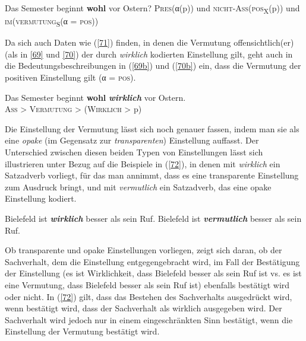 \begin{exe}
	\ex\label{70} 
		\begin{xlist}	
			\ex\label{70a} Das Semester beginnt \textbf{wohl} vor Ostern?
			\ex\label{70b} \textsc{Pres}(α(p)) und \textsc{nicht-Ass}(\textsc{pos}\textsubscript{X}(p)) und \textsc{im}(\textsc{vermutung}\textsubscript{\textrm{S}}(α = \textsc{pos}))
		\end{xlist}
\end{exe}
Da sich auch Daten wie (\ref{71}) finden, in denen die Vermutung offensichtlich(er) (als in \ref{69} und \ref{70}) der durch \textit{wirklich} kodierten Einstellung gilt, geht auch in die Bedeutungsbeschreibungen in (\ref{69b}) und (\ref{70b}) ein, dass die Vermutung der positiven Einstellung gilt (α = \textrm{\textsc{pos}}).

\begin{exe}
	\ex\label{71} 
	Das Semester beginnt \textbf{wohl} \textbf{\textit{wirklich}} vor Ostern.\\
	\textsc{Ass} > \textsc{Vermutung} > (\textsc{Wirklich} > p)	
\end{exe}
Die Einstellung der Vermutung lässt sich noch genauer fassen, indem man sie als eine \textit{opake} (im Gegensatz zur \textit{transparenten})  Einstellung auffasst. Der Unterschied zwischen diesen beiden Typen von Einstellungen lässt sich illustrieren unter Bezug auf die Beispiele in (\ref{72}), in denen mit \textit{wirklich} ein Satzadverb vorliegt, für das man annimmt, dass es eine transparente Einstellung zum Ausdruck bringt, und mit \textit{vermutlich} ein Satzadverb, das eine opake Einstellung kodiert.

\begin{exe}
	\ex\label{72} 
		\begin{xlist}	
			\ex\label{72a} Bielefeld ist \textbf{\textit{wirklich}} besser als sein Ruf.
			\ex\label{72b} Bielefeld ist \textbf{\textit{vermutlich}} besser als sein Ruf.
		\end{xlist}
\end{exe}	
Ob transparente und opake Einstellungen vorliegen, zeigt sich daran, ob der Sachverhalt, dem die Einstellung entgegengebracht wird, im Fall der Bestätigung der Einstellung (es ist Wirklichkeit, dass Bielefeld besser als sein Ruf ist vs. es ist eine Vermutung, dass Bielefeld besser als sein Ruf ist) ebenfalls bestätigt wird oder nicht. In (\ref{72}) gilt, dass das Bestehen des Sachverhalts ausgedrückt wird, wenn bestätigt wird, dass der Sachverhalt als wirklich ausgegeben wird. Der Sachverhalt wird jedoch nur in einem eingeschränkten Sinn bestätigt, wenn die Einstellung der Vermutung bestätigt wird. 

